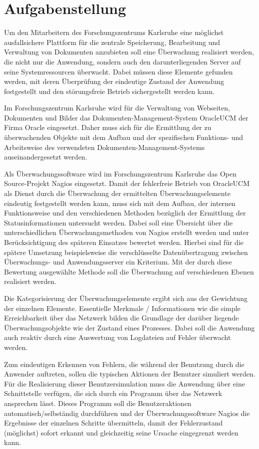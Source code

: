 \section{Aufgabenstellung}

Um den Mitarbeitern des Forschungszentrums Karlsruhe eine möglichst ausfallsichere Plattform für die zentrale Speicherung, Bearbeitung und Verwaltung von Dokumenten anzubieten soll eine Überwachung realisiert werden, die nicht nur die Anwendung, sondern auch den darunterliegenden Server auf seine Systemressourcen überwacht.
Dabei müssen diese Elemente gefunden werden, mit deren Überprüfung der eindeutige Zustand der Anwendung festgestellt und den störungsfreie Betrieb sichergestellt werden kann.

Im Forschungszentrum Karlsruhe wird für die Verwaltung von Webseiten, Dokumenten und Bilder das Dokumenten-Management-System \gls{OracleUCM} der Firma Oracle  eingesetzt.
Daher muss sich für die Ermittlung der zu überwachenden Objekte mit dem Aufbau und der spezifischen Funktions- und Arbeitsweise des verwendeten Dokumenten-Management-Systems auseinandergesetzt werden.

Als Überwachungssoftware wird im Forschungszentrum Karlsruhe das Open Source-Projekt Nagios eingesetzt.
Damit der fehlerfreie Betrieb von \gls{OracleUCM} als Dienst durch die Überwachung der ermittelten Überwachungselemente eindeutig festgestellt werden kann, muss sich mit dem Aufbau, der internen Funktionsweise und den verschiedenen Methoden bezüglich der Ermittlung der Statusinformationen untersucht werden.
Dabei soll eine Übersicht über die unterschiedlichen Überwachungsmethoden von Nagios erstellt werden und unter Berücksichtigung des späteren Einsatzes bewertet werden.
Hierbei sind für die spätere Umsetzung beispielsweise die verschlüsselte Datenübertragung zwischen Überwachungs- und Anwendungsserver ein Kriterium.
Mit der durch diese Bewertung ausgewählte Methode soll die Überwachung auf verschiedenen Ebenen realisiert werden.

Die Kategorisierung der Überwachungselemente ergibt sich aus der Gewichtung der einzelnen Elemente.
Essentielle Merkmale / Informationen wie die simple Erreichbarkeit über das Netzwerk bilden die Grundlage der darüber liegende Überwachungsobjekte wie der Zustand eines Prozesses.
Dabei soll die Anwendung auch reaktiv durch eine Auswertung von Logdateien auf Fehler überwacht werden.


Zum eindeutigen Erkennen von Fehlern, die während der Benutzung durch die Anwender auftreten, sollen die typischen Aktionen der Benutzer simuliert werden. 
Für die Realisierung dieser Benutzersimulation muss die Anwendung über eine Schnittstelle verfügen, die sich durch ein Programm über das Netzwerk ansprechen lässt.
Dieses Programm soll die Benutzeraktionen automatisch/selbständig durchführen und der Überwachungssoftware Nagios die Ergebnisse der einzelnen Schritte übermitteln, damit der Fehlerzustand (möglichst) sofort erkannt und gleichzeitig seine Ursache eingegrenzt werden kann.

